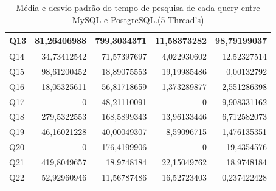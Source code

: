 \documentclass{article}
\begin{document}
\begin{table}[H]
{\begin{tabular}{|l|r|r|r|r|}
        Q13&	81,26406988	&799,3034371 &11,58373282 &98,79199037\\ \hline
        Q14&	34,73412542	&71,57397697 &4,022930602  &12,52327514\\ \hline
        Q15&	98,61200452	&18,89075553& 19,19985486 &0,00132792\\ \hline
        Q16&	18,05325611	&56,81718659 &1,373289877 &2,551286398\\ \hline
        Q17&	0	&48,21110091& 0  &9,908331162\\ \hline
        Q18&	279,5322553&	168,5899343 &13,96133446 &6,712582073\\ \hline
        Q19&	46,16021228&	40,00049307& 8,59096715 &1,476135351\\ \hline
        Q20&	0	&176,4199906 &0  &19,4354576\\ \hline
        Q21&	419,8049657	&18,9748184 &22,15049762 &18,9748184\\ \hline
        Q22&	52,92960946	&11,56787486 &16,52723403 &0,237422428\\ \hline
    \end{tabular}}
    \caption{Média e desvio padrão do tempo de pesquisa de cada query entre MySQL e PostgreSQL.(5 Thread's)}
    \label{tab:BC_Table6}
  \end{table}
\end{document}
